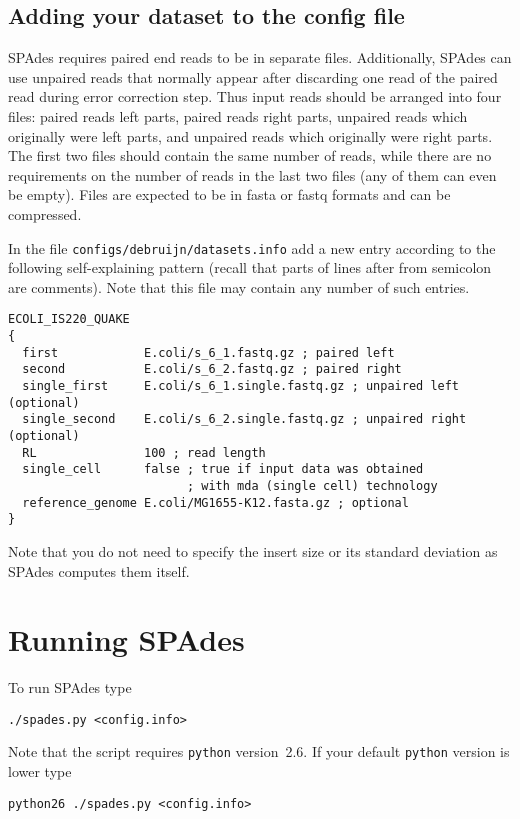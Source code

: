 \documentclass{article}
\def\spades{SPAdes}
\def\bh{BayesHammer}
\begin{document}

\subsection{Adding your dataset to the config file}\label{subsec:datasets}
{\spades} requires paired end reads to be in separate files.
Additionally, {\spades} can use unpaired reads that normally appear after discarding one read of the paired read during error correction step.
Thus input reads should be arranged into four files: paired reads left parts, paired reads right parts, unpaired reads which originally were left parts, and
unpaired reads which originally were right parts. The first two files should contain the same number of reads, while
there are no requirements on the number of reads in the last two files (any of them can even be empty).
Files are expected to be in fasta or fastq formats and can be compressed.

In the file {\tt configs/debruijn/datasets.info} add a new entry according to the following self-explaining pattern (recall that parts of lines after from
semicolon are comments). Note that this file may contain any number of such entries.
\begin{lstlisting}
ECOLI_IS220_QUAKE
{
  first            E.coli/s_6_1.fastq.gz ; paired left
  second           E.coli/s_6_2.fastq.gz ; paired right
  single_first     E.coli/s_6_1.single.fastq.gz ; unpaired left (optional)
  single_second    E.coli/s_6_2.single.fastq.gz ; unpaired right (optional)
  RL               100 ; read length
  single_cell      false ; true if input data was obtained 
                         ; with mda (single cell) technology
  reference_genome E.coli/MG1655-K12.fasta.gz ; optional
}
\end{lstlisting}
Note that you do not need to specify the insert size or its standard deviation as {\spades}
computes them itself.

\section{Running {\spades}}\label{sec:running}
To run {\spades} type
\begin{lstlisting}
./spades.py <config.info>
\end{lstlisting}
Note that the script requires {\tt python} version~2.6.
If your default {\tt python} version is lower  type
\begin{lstlisting}
python26 ./spades.py <config.info>
\end{lstlisting}
\end{document}
